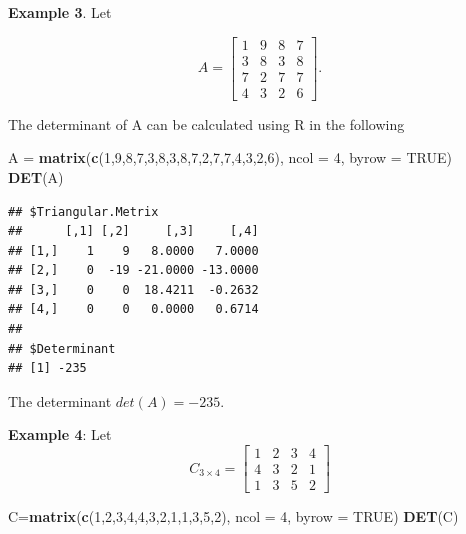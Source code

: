 \documentclass[
]{book}
\newenvironment{Shaded}{\begin{snugshade}}{\end{snugshade}}
\newcommand{\AttributeTok}[1]{\textcolor[rgb]{0.13,0.29,0.53}{#1}}
\newcommand{\ConstantTok}[1]{\textcolor[rgb]{0.56,0.35,0.01}{#1}}
\newcommand{\DecValTok}[1]{\textcolor[rgb]{0.00,0.00,0.81}{#1}}
\newcommand{\FunctionTok}[1]{\textcolor[rgb]{0.13,0.29,0.53}{\textbf{#1}}}
\newcommand{\NormalTok}[1]{#1}
\newcommand{\OtherTok}[1]{\textcolor[rgb]{0.56,0.35,0.01}{#1}}
\begin{document}
\textbf{Example 3}. Let

\[
A = \left[\begin{array}{cccc} 
1 & 9 & 8 & 7 \\ 
3 & 8 & 3 & 8\\ 
7 & 2 & 7 & 7\\
4 & 3 & 2 & 6
\end{array}
\right].
\]

The determinant of A can be calculated using R in the following

\begin{Shaded}
\begin{Highlighting}[]
\NormalTok{A }\OtherTok{=} \FunctionTok{matrix}\NormalTok{(}\FunctionTok{c}\NormalTok{(}\DecValTok{1}\NormalTok{,}\DecValTok{9}\NormalTok{,}\DecValTok{8}\NormalTok{,}\DecValTok{7}\NormalTok{,}\DecValTok{3}\NormalTok{,}\DecValTok{8}\NormalTok{,}\DecValTok{3}\NormalTok{,}\DecValTok{8}\NormalTok{,}\DecValTok{7}\NormalTok{,}\DecValTok{2}\NormalTok{,}\DecValTok{7}\NormalTok{,}\DecValTok{7}\NormalTok{,}\DecValTok{4}\NormalTok{,}\DecValTok{3}\NormalTok{,}\DecValTok{2}\NormalTok{,}\DecValTok{6}\NormalTok{), }\AttributeTok{ncol =} \DecValTok{4}\NormalTok{, }\AttributeTok{byrow =} \ConstantTok{TRUE}\NormalTok{)}
\FunctionTok{DET}\NormalTok{(A)}
\end{Highlighting}
\end{Shaded}

\begin{verbatim}
## $Triangular.Metrix
##      [,1] [,2]     [,3]     [,4]
## [1,]    1    9   8.0000   7.0000
## [2,]    0  -19 -21.0000 -13.0000
## [3,]    0    0  18.4211  -0.2632
## [4,]    0    0   0.0000   0.6714
## 
## $Determinant
## [1] -235
\end{verbatim}

The determinant \(det(A) = -235\).

\textbf{Example 4}: Let
\[
C_{3\times 4} = \left[\begin{array}{cccc} 
1& 2 & 3 & 4  \\ 
4 & 3 & 2 & 1 \\ 
1 & 3 & 5 & 2  
\end{array}
\right]
\]

\begin{Shaded}
\begin{Highlighting}[]
\NormalTok{C}\OtherTok{=}\FunctionTok{matrix}\NormalTok{(}\FunctionTok{c}\NormalTok{(}\DecValTok{1}\NormalTok{,}\DecValTok{2}\NormalTok{,}\DecValTok{3}\NormalTok{,}\DecValTok{4}\NormalTok{,}\DecValTok{4}\NormalTok{,}\DecValTok{3}\NormalTok{,}\DecValTok{2}\NormalTok{,}\DecValTok{1}\NormalTok{,}\DecValTok{1}\NormalTok{,}\DecValTok{3}\NormalTok{,}\DecValTok{5}\NormalTok{,}\DecValTok{2}\NormalTok{), }\AttributeTok{ncol =} \DecValTok{4}\NormalTok{, }\AttributeTok{byrow =} \ConstantTok{TRUE}\NormalTok{)}
\FunctionTok{DET}\NormalTok{(C)}
\end{Highlighting}
\end{Shaded}
\end{document}
